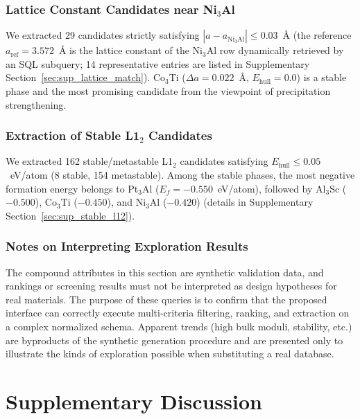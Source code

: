 \subsubsection{Lattice Constant Candidates near Ni$_3$Al}
\label{sec:ni3al_lattice}

We extracted 29 candidates strictly satisfying $|a - a_{\text{Ni}_3\text{Al}}| \leq 0.03$~\AA{}{} (the reference $a_{\text{ref}} = 3.572$~\AA{}{} is the lattice constant of the Ni$_3$Al row dynamically retrieved by an SQL subquery; 14 representative entries are listed in Supplementary Section~\ref{sec:sup_lattice_match}). Co$_3$Ti ($\Delta a = 0.022$~\AA{}{}, $E_\text{hull} = 0.0$) is a stable phase and the most promising candidate from the viewpoint of precipitation strengthening.

\subsubsection{Extraction of Stable L1$_2$ Candidates}
\label{sec:stable_l12}

We extracted 162 stable/metastable L1$_2$ candidates satisfying $E_\text{hull} \leq 0.05$~eV/atom (8 stable, 154 metastable). Among the stable phases, the most negative formation energy belongs to Pt$_3$Al ($E_f = -0.550$~eV/atom), followed by Al$_3$Sc ($-0.500$), Co$_3$Ti ($-0.450$), and Ni$_3$Al ($-0.420$) (details in Supplementary Section~\ref{sec:sup_stable_l12}).

\subsubsection{Notes on Interpreting Exploration Results}

The compound attributes in this section are synthetic validation data, and rankings or screening results must not be interpreted as design hypotheses for real materials. The purpose of these queries is to confirm that the proposed interface can correctly execute multi-criteria filtering, ranking, and extraction on a complex normalized schema. Apparent trends (high bulk moduli, stability, etc.) are byproducts of the synthetic generation procedure and are presented only to illustrate the kinds of exploration possible when substituting a real database.

\section{Supplementary Discussion}
\label{sec:sup_discussion_details}

